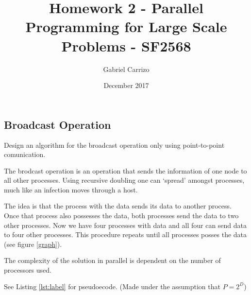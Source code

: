\documentclass[a4paper]{exam}
\title{Homework 2 - Parallel Programming for Large Scale Problems - SF2568}
\author{Gabriel Carrizo}
\date{December 2017}
\begin{document}
\maketitle

\pagebreak
\begin{questions}

\section{Broadcast Operation}

\addpoints\question Design an algorithm for the broadcast operation only using point-to-point comunication.

\begin{solution}
The brodcast operation is an operation that sends the information of one node to all other processes. Using recursive doubling one can `spread' amongst processes, much like an infection moves through a host.

The idea is that the process with the data sends its data to another process. Once that process also possesses the data, both processes send the data to two other processes. Now we have four processes with data and all four can send data to four other processes. This procedure repeats until all processes posses the data (see figure \ref{graph}).

The complexity of the solution in parallel is dependent on the number of processors used.

See Listing \ref{lst:label} for pseudoecode. (Made under the assumption that $P=2^D$)
\end{solution}

\begin{figure}
  \center
{}
\end{figure}
\end{questions}
\end{document}
